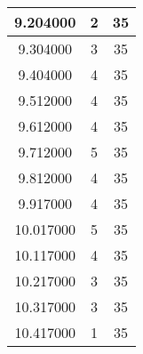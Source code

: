 \begin{longtable}[htbp]{|c|c|c|}
9.204000 & 2 & 35 \\ \hline
9.304000 & 3 & 35 \\ \hline
9.404000 & 4 & 35 \\ \hline
9.512000 & 4 & 35 \\ \hline
9.612000 & 4 & 35 \\ \hline
9.712000 & 5 & 35 \\ \hline
9.812000 & 4 & 35 \\ \hline
9.917000 & 4 & 35 \\ \hline
10.017000 & 5 & 35 \\ \hline
10.117000 & 4 & 35 \\ \hline
10.217000 & 3 & 35 \\ \hline
10.317000 & 3 & 35 \\ \hline
10.417000 & 1 & 35 \\ \hline
\end{longtable}
